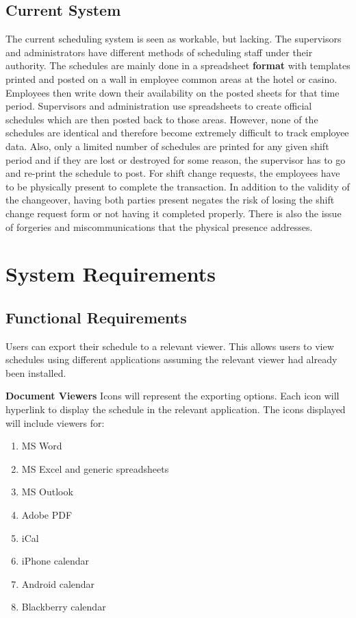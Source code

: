 \documentclass[letterpaper,12pt]{report}
\begin{document}
\section{Current System}
\hspace{1cm}The current scheduling system is seen as workable, but lacking. The supervisors and administrators have different methods of scheduling staff under their authority. The schedules are mainly done in a spreadsheet \textbf{format} with templates printed and posted on a wall in employee common areas at the hotel or casino. Employees then write down their availability on the posted sheets for that time period. Supervisors and administration use spreadsheets to create official schedules which are then posted back to those areas. However, none of the schedules are identical and therefore become extremely difficult to track employee data. Also, only a limited number of schedules are printed for any given shift period and if they are lost or destroyed for some reason, the supervisor has to go and re-print the schedule to post.
For shift change requests, the employees have to be physically present to complete the transaction. In addition to the validity of the changeover, having both parties present negates the risk of losing the shift change request form or not having it completed properly. There is also the issue of forgeries and miscommunications that the physical presence addresses.

\chapter{System Requirements}
\section{Functional Requirements}

Users can export their schedule to a relevant viewer. This allows users to view schedules using different applications assuming the relevant viewer had already been installed. 

\textbf{Document Viewers}
Icons will represent the exporting options. Each icon will hyperlink to display the schedule in the relevant application. The icons displayed will include viewers for:
\begin{enumerate}
 \item MS Word
 \item MS Excel and generic spreadsheets
 \item MS Outlook
 \item Adobe PDF
 \item iCal
 \item iPhone calendar
 \item Android calendar
 \item Blackberry calendar
\end{enumerate}
\pagebreak
\end{document}
